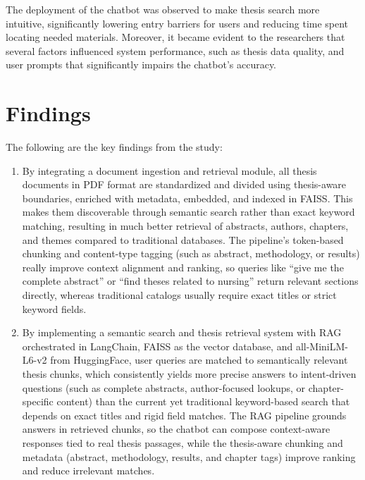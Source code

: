 \begin{refsection}
The deployment of the chatbot was observed to make thesis search more intuitive, significantly lowering entry barriers for users and reducing time spent locating needed materials. Moreover, it became evident to the researchers that several factors influenced system performance, such as thesis data quality,  and user prompts that significantly impairs the chatbot's accuracy.

\section*{Findings}

The following are the key findings from the study:

\begin{enumerate}
    \item By integrating a document ingestion and retrieval module, all thesis documents in PDF format are standardized and divided using thesis-aware boundaries, enriched with metadata, embedded, and indexed in FAISS. This makes them discoverable through semantic search rather than exact keyword matching, resulting in much better retrieval of abstracts, authors, chapters, and themes compared to traditional databases. The pipeline’s token-based chunking and content-type tagging (such as abstract, methodology, or results) really improve context alignment and ranking, so queries like “give me the complete abstract” or “find theses related to nursing” return relevant sections directly, whereas traditional catalogs usually require exact titles or strict keyword fields.

    \item By implementing a semantic search and thesis retrieval system with RAG orchestrated in LangChain, FAISS as the vector database, and all-MiniLM-L6-v2 from HuggingFace, user queries are matched to semantically relevant thesis chunks, which consistently yields more precise answers to intent-driven questions (such as complete abstracts, author-focused lookups, or chapter-specific content) than the current yet traditional keyword-based search that depends on exact titles and rigid field matches. The RAG pipeline grounds answers in retrieved chunks, so the chatbot can compose context-aware responses tied to real thesis passages, while the thesis-aware chunking and metadata (abstract, methodology, results, and chapter tags) improve ranking and reduce irrelevant matches.


\end{enumerate}
\end{refsection}
